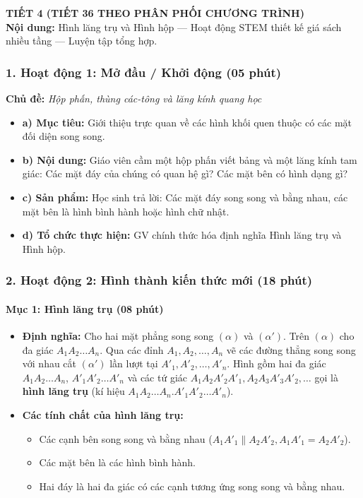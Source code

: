 \documentclass[12pt, a4paper]{article}
\begin{document}
\newpage

{\large \textbf{TIẾT 4 (TIẾT 36 THEO PHÂN PHỐI CHƯƠNG TRÌNH)}}\\[0.3em]
\textbf{Nội dung:} Hình lăng trụ và Hình hộp --- Hoạt động STEM thiết kế giá sách nhiều tầng --- Luyện tập tổng hợp.

\subsubsection*{1. Hoạt động 1: Mở đầu / Khởi động (05 phút)}
\textbf{Chủ đề:} \textit{Hộp phấn, thùng các-tông và lăng kính quang học}
\begin{itemize}
    \item \textbf{a) Mục tiêu:} Giới thiệu trực quan về các hình khối quen thuộc có các mặt đối diện song song.
    \item \textbf{b) Nội dung:} Giáo viên cầm một hộp phấn viết bảng và một lăng kính tam giác: Các mặt đáy của chúng có quan hệ gì? Các mặt bên có hình dạng gì?
    \item \textbf{c) Sản phẩm:} Học sinh trả lời: Các mặt đáy song song và bằng nhau, các mặt bên là hình bình hành hoặc hình chữ nhật.
    \item \textbf{d) Tổ chức thực hiện:} GV chính thức hóa định nghĩa Hình lăng trụ và Hình hộp.
\end{itemize}

\subsubsection*{2. Hoạt động 2: Hình thành kiến thức mới (18 phút)}

\paragraph{Mục 1: Hình lăng trụ (08 phút)}
\begin{itemize}
    \item \textbf{Định nghĩa:} Cho hai mặt phẳng song song $(\alpha)$ và $(\alpha')$. Trên $(\alpha)$ cho đa giác $A_1A_2\dots A_n$. Qua các đỉnh $A_1, A_2, \dots, A_n$ vẽ các đường thẳng song song với nhau cắt $(\alpha')$ lần lượt tại $A'_1, A'_2, \dots, A'_n$.
    Hình gồm hai đa giác $A_1A_2\dots A_n$, $A'_1A'_2\dots A'_n$ và các tứ giác $A_1A_2A'_2A'_1, A_2A_3A'_3A'_2, \dots$ gọi là \textbf{hình lăng trụ} (kí hiệu $A_1A_2\dots A_n.A'_1A'_2\dots A'_n$).
    \item \textbf{Các tính chất của hình lăng trụ:}
    \begin{itemize}
        \item Các cạnh bên song song và bằng nhau ($A_1A'_1 \parallel A_2A'_2, A_1A'_1 = A_2A'_2$).
        \item Các mặt bên là các hình bình hành.
        \item Hai đáy là hai đa giác có các cạnh tương ứng song song và bằng nhau.
    \end{itemize}
\end{itemize}
\end{document}

